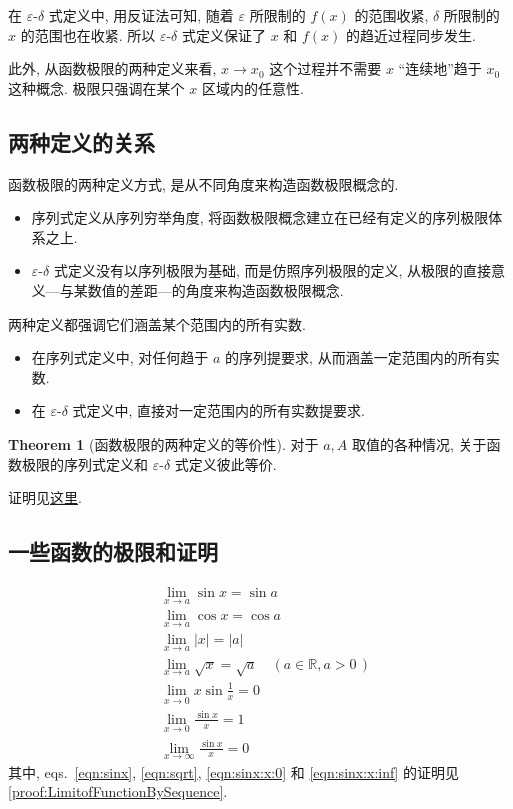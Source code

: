 \documentclass{book}
\newcommand{\abs}[1]{\left\lvert #1 \right\rvert}
\newcommand{\R}{\mathbb{R}}
\numberwithin{equation}{section}
\numberwithin{figure}{section}
\theoremstyle{definition}
\newtheorem{theorem}{Theorem}[section]
\newcommand{\dq}[1]{``#1''}
\begin{document}
在 $\varepsilon$-$\delta$ 式定义中, 用反证法可知, 随着 $\varepsilon$ 所限制的 $f(x)$ 的范围收紧, $\delta$ 所限制的 $x$ 的范围也在收紧. 所以 $\varepsilon$-$\delta$ 式定义保证了 $x$ 和 $f(x)$ 的趋近过程同步发生.

此外, 从函数极限的两种定义来看, $x\to x_0$ 这个过程并不需要 $x$ \dq{连续地}趋于 $x_0$ 这种概念. 极限只强调在某个 $x$ 区域内的任意性. 

\subsection{两种定义的关系}
函数极限的两种定义方式, 是从不同角度来构造函数极限概念的.
\begin{itemize}
  \item 序列式定义从序列穷举角度, 将函数极限概念建立在已经有定义的序列极限体系之上.
  \item $\varepsilon$-$\delta$ 式定义没有以序列极限为基础, 而是仿照序列极限的定义, 从极限的直接意义---与某数值的差距---的角度来构造函数极限概念.
\end{itemize}

两种定义都强调它们涵盖某个范围内的所有实数.
\begin{itemize}
  \item 在序列式定义中, 对任何趋于 $a$ 的序列提要求, 从而涵盖一定范围内的所有实数.
  \item 在 $\varepsilon$-$\delta$ 式定义中, 直接对一定范围内的所有实数提要求.
\end{itemize}

\begin{theorem}[函数极限的两种定义的等价性]
  \leavevmode

  对于 $a,A$ 取值的各种情况, 关于函数极限的序列式定义和 $\varepsilon$-$\delta$ 式定义彼此等价.
  \label{the:EquivalenceFunctionLimit}
\end{theorem}
证明见\hyperlink{proof:EquivalenceFunctionLimit}{这里}.


\subsection{一些函数的极限和证明}
\begin{align}
  &\lim_{x\to a}\sin x                =\sin a\label{eqn:sinx}\\
  &\lim_{x\to a}\cos x                =\cos a\\
  &\lim_{x\to a}\abs{x}               =\abs{a}\\
  &\lim_{x\to a}\sqrt{x}              =\sqrt{a}\quad (a\in\R,a>0\,\label{eqn:sqrt})\\
  &\lim_{x\to 0}x\sin\frac{1}{x}      =0\\
  &\lim_{x\to 0}\frac{\sin x}{x}      =1\label{eqn:sinx:x:0}\\
  &\lim_{x\to\infty}\frac{\sin x}{x}  =0\label{eqn:sinx:x:inf}
\end{align}
其中, eqs.~\eqref{eqn:sinx}, \eqref{eqn:sqrt}, \eqref{eqn:sinx:x:0} 和 \eqref{eqn:sinx:x:inf} 的证明见 \cref{proof:LimitofFunctionBySequence}.
\end{document}
